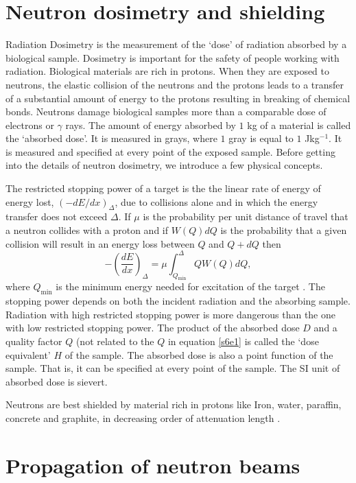 \documentclass{article}
\numberwithin{equation}{section}
\begin{document}
\section{Neutron dosimetry and shielding}\label{s6}
Radiation Dosimetry is the measurement of the `dose' of radiation absorbed by
a biological sample. Dosimetry is important for the safety of people working
with radiation. Biological materials are rich in protons. When they are
exposed to neutrons, the elastic collision of the neutrons and the protons
leads to a transfer of a substantial amount of energy to the protons resulting
in breaking of chemical bonds. Neutrons damage biological samples more than
a comparable dose of electrons or $\gamma$ rays. The amount of energy absorbed
by $1$ kg of a material is called the `absorbed dose'. It is measured in grays,
where $1$ gray is equal to $1$ Jkg${}^{-1}$. It is measured and specified at 
every point of the exposed sample. Before getting into the details of neutron
dosimetry, we introduce a few physical concepts.

The restricted stopping power of a target is the the linear rate of energy of
energy lost,  $(-dE/dx)_\Delta$, due to collisions alone and in which the
energy transfer does not exceed $\Delta$. If $\mu$ is the probability per unit
distance of travel that a neutron collides with a proton and if $W(Q)dQ$ is the 
probability that a given collision will result in an energy loss between $Q$
and $Q + dQ$ then
\begin{equation}\label{s6e1}
-\left(\frac{dE}{dx}\right)_\Delta = \mu\int_{Q_{\text{min}}}^\Delta QW(Q)dQ,
\end{equation}
where $Q_{\text{min}}$ is the minimum energy needed for excitation of the 
target \cite{turner2008atoms}. The stopping power depends on both the 
incident radiation and the absorbing sample. Radiation with high restricted
stopping power is more dangerous than the one with low restricted stopping 
power. The product of the absorbed dose $D$ and a quality factor $Q$ (not 
related to the $Q$ in equation \eqref{s6e1} is called the `dose equivalent'
$H$ of the sample. The absorbed dose is also a point function of the sample.
That is, it can be specified at every point of the sample. The SI unit of 
absorbed dose is sievert.

Neutrons are best shielded by material rich in protons like Iron, water, 
paraffin, concrete and graphite, in decreasing order of attenuation length
\cite{turner2008atoms}.
\section{Propagation of neutron beams}\label{s7}
\end{document}
